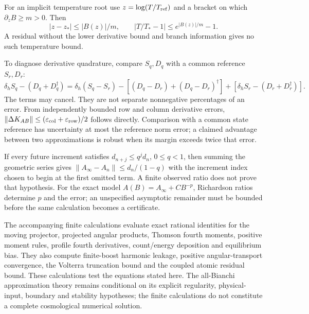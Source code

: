 For an implicit temperature root use $z=\log(T/T_{\rm ref})$ and a bracket on which $\partial_zB\ge m>0$. Then
\begin{equation}
 |z-z_*|\le|B(z)|/m,\qquad
 |T/T_*-1|\le e^{|B(z)|/m}-1 .
 \label{v:root_residual}
\end{equation}
A residual without the lower derivative bound and branch information gives no such temperature bound.

To diagnose derivative quadrature, compare $S_q,D_q$ with a common reference $S_r,D_r$:
\begin{equation}
 \delta_hS_q-(D_q+D_q^\dagger)
 =\delta_h(S_q-S_r)-[(D_q-D_r)+(D_q-D_r)^\dagger]
 +[\delta_hS_r-(D_r+D_r^\dagger)] .
 \label{v:quadrature_residual}
\end{equation}
The terms may cancel. They are not separate nonnegative percentages of an error. From independently bounded row and column derivative errors,
$\|\Delta K_{AB}\|\le(\varepsilon_{\rm col}+\varepsilon_{\rm row})/2$ follows directly. Comparison with a common state reference has uncertainty at most the reference norm error; a claimed advantage between two approximations is robust when its margin exceeds twice that error.

If every future increment satisfies $d_{n+j}\le q^jd_n$, $0\le q<1$, then summing the geometric series gives
$\|A_\infty-A_n\|\le d_n/(1-q)$ with the increment index chosen to begin at the first omitted term. A finite observed ratio does not prove that hypothesis. For the exact model $A(B)=A_\infty+CB^{-p}$, Richardson ratios determine $p$ and the error; an unspecified asymptotic remainder must be bounded before the same calculation becomes a certificate.

The accompanying finite calculations evaluate exact rational identities for the moving projector, projected angular products, Thomson fourth moments, positive moment rules, profile fourth derivatives, count/energy deposition and equilibrium bias. They also compute finite-boost harmonic leakage, positive angular-transport convergence, the Volterra truncation bound and the coupled atomic residual bound. These calculations test the equations stated here. The all-Bianchi approximation theory remains conditional on its explicit regularity, physical-input, boundary and stability hypotheses; the finite calculations do not constitute a complete cosmological numerical solution.
